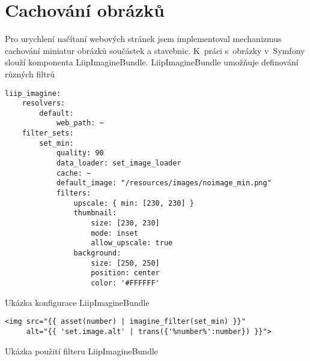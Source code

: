 \section{Cachování obrázků}
Pro urychlení načítaní webových stránek jsem implementoval mechanizmus cachování miniatur obrázků součástek a stavebnic. K~práci s~obrázky v~Symfony slouží komponenta LiipImagineBundle. LiipImagineBundle umožňuje definování různých filtrů 

\begin{listing}[htbp]
  \begin{verbatim}
liip_imagine:
    resolvers:
        default:
            web_path: ~
    filter_sets:
        set_min:
            quality: 90
            data_loader: set_image_loader
            cache: ~
            default_image: "/resources/images/noimage_min.png"
            filters:
                upscale: { min: [230, 230] }
                thumbnail:
                    size: [230, 230] 
                    mode: inset
                    allow_upscale: true 
                background: 
                    size: [250, 250]
                    position: center
                    color: '#FFFFFF'
  \end{verbatim}
  \caption{Ukázka konfigurace LiipImagineBundle\label{liip-imagine-config}}
\end{listing}

\begin{listing}[htbp]
  \begin{verbatim}
<img src="{{ asset(number) | imagine_filter(set_min) }}" 
     alt="{{ 'set.image.alt' | trans({'%number%':number}) }}">
    \end{verbatim}
  \caption{Ukázka použití filteru LiipImagineBundle\label{liip-imagine-usage}}
\end{listing}   